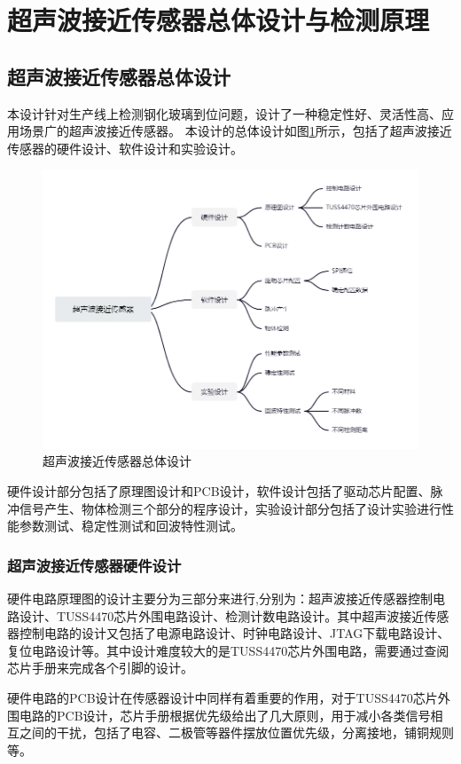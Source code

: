 \newpage
\section{超声波接近传感器总体设计与检测原理}
\subsection{超声波接近传感器总体设计}
本设计针对生产线上检测钢化玻璃到位问题，设计了一种稳定性好、灵活性高、应用场景广的超声波接近传感器。
本设计的总体设计如图\ref{超声波接近传感器总体设计}所示，包括了超声波接近传感器的硬件设计、软件设计和实验设计。
\begin{figure}[ht]
	\centering
	\includegraphics[width=12cm]{figure/overall designment.png}
	\caption{超声波接近传感器总体设计}
	\label{超声波接近传感器总体设计}
\end{figure}

硬件设计部分包括了原理图设计和PCB设计，软件设计包括了驱动芯片配置、脉冲信号产生、物体检测三个部分的程序设计，实验设计部分包括了设计实验进行性能参数测试、稳定性测试和回波特性测试。
\subsubsection{超声波接近传感器硬件设计}
硬件电路原理图的设计主要分为三部分来进行,分别为：超声波接近传感器控制电路设计、TUSS4470芯片外围电路设计、检测计数电路设计。其中超声波接近传感器控制电路的设计又包括了电源电路设计、时钟电路设计、JTAG下载电路设计、复位电路设计等。其中设计难度较大的是TUSS4470芯片外围电路，需要通过查阅芯片手册来完成各个引脚的设计。\par
硬件电路的PCB设计在传感器设计中同样有着重要的作用，对于TUSS4470芯片外围电路的PCB设计，芯片手册根据优先级给出了几大原则，用于减小各类信号相互之间的干扰，包括了电容、二极管等器件摆放位置优先级，分离接地，铺铜规则等。
